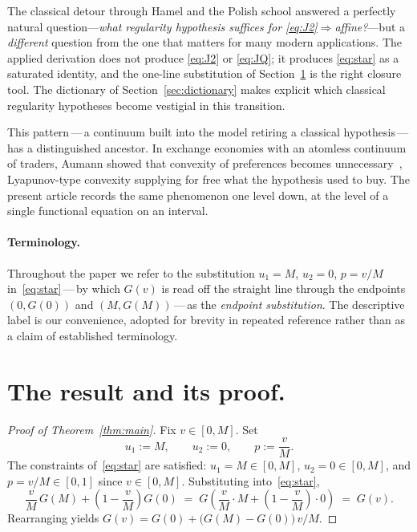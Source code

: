 \documentclass{article}
\theoremstyle{plain}
\theoremstyle{definition}
\begin{document}
The classical detour through Hamel and the Polish school answered a
perfectly natural question---\emph{what regularity hypothesis suffices
for \eqref{eq:J2}$\Rightarrow$affine?}---but a \emph{different}
question from the one that matters for many modern applications. The
applied derivation does not produce \eqref{eq:J2} or \eqref{eq:JQ};
it produces \eqref{eq:star} as a saturated identity, and the one-line
substitution of Section~\ref{sec:proof} is the right closure tool. The
dictionary of Section~\ref{sec:dictionary} makes explicit which classical
regularity hypotheses become vestigial in this transition.

This pattern\,---\,a continuum built into the model retiring a
classical hypothesis\,---\,has a distinguished ancestor. In exchange
economies with an atomless continuum of traders, Aumann showed that
convexity of preferences becomes unnecessary~\cite{Aumann1964},
Lyapunov-type convexity supplying for free what the hypothesis used to
buy. The present article records the same phenomenon one level down, at
the level of a single functional equation on an interval.

\paragraph{Terminology.}
Throughout the paper we refer to the substitution $u_1=M$, $u_2=0$,
$p=v/M$ in~\eqref{eq:star}\,---\,by which $G(v)$ is read off the straight
line through the endpoints $(0,G(0))$ and $(M,G(M))$\,---\,as the
\emph{endpoint substitution}. The descriptive
label is our convenience, adopted for brevity in repeated reference
rather than as a claim of established terminology.

\section{The result and its proof.}
\label{sec:proof}

\begin{proof}[Proof of Theorem~\ref{thm:main}]
Fix $v\in[0,M]$. Set
\[
u_1 := M, \qquad u_2 := 0, \qquad p := \frac{v}{M}.
\]
The constraints of~\eqref{eq:star} are satisfied: $u_1=M\in[0,M]$,
$u_2=0\in[0,M]$, and $p=v/M\in[0,1]$ since $v\in[0,M]$.
Substituting into~\eqref{eq:star},
\[
\frac{v}{M}\,G(M)+\left(1-\frac{v}{M}\right)G(0)
\;=\;
G\!\left(\frac{v}{M}\cdot M+\left(1-\frac{v}{M}\right)\cdot 0\right)
\;=\; G(v).
\]
Rearranging yields $G(v)=G(0)+\bigl(G(M)-G(0)\bigr)\,v/M$.
\end{proof}
\end{document}
